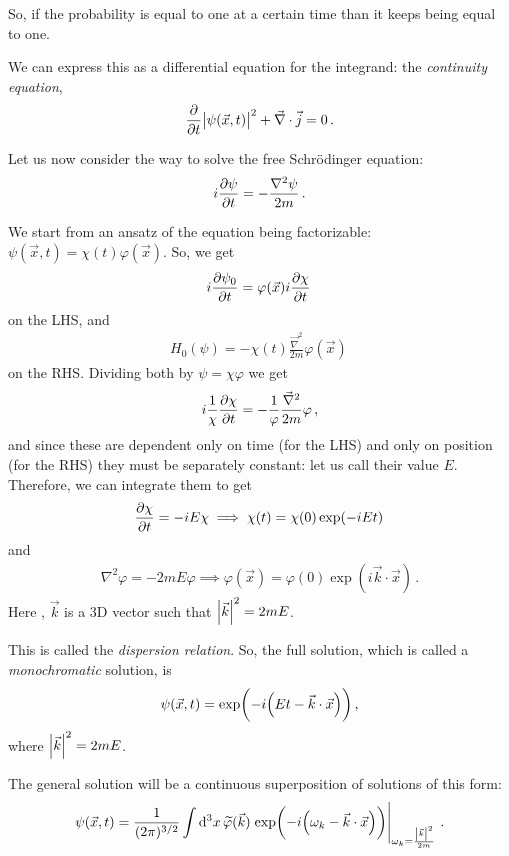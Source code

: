 \documentclass[main.tex]{subfiles}
\begin{document}
So, if the probability is equal to one at a certain time than it keeps being equal to one. 

We can express this as a differential equation for the integrand: the \emph{continuity equation}, 
%
\begin{align}
\pdv{}{t} \abs{\psi  (\vec{x}, t)}^2 + \vec{\nabla} \cdot \vec{j} = 0
\,.
\end{align}

Let us now consider the way to solve the free Schrödinger equation: 
%
\begin{align}
i \pdv{\psi }{t} = - \frac{\nabla^2 \psi }{2m } 
\,.
\end{align}

We start from an ansatz of the equation being factorizable: \(\psi (\vec{x}, t) = \chi (t) \varphi (\vec{x})\). So, we get 
%
\begin{align}
i \pdv{\psi_{0}}{t} = \varphi (\vec{x}) i \pdv{\chi }{t}
\,
\end{align}
%
on the LHS, and 
%
\begin{align}
H_0 (\psi ) = - \chi (t) \frac{\vec{\nabla}^2}{2m} \varphi (\vec{x})
\,
\end{align}
%
on the RHS. Dividing both by \(\psi = \chi \varphi \) we get 
%
\begin{align}
i \frac{1}{\chi } \pdv{\chi }{t} = - \frac{1}{\varphi } \frac{\vec{\nabla}^2}{2m} \varphi 
\,,
\end{align}
%
and since these are dependent only on time (for the LHS) and only on position (for the RHS) they must be separately constant: let us call their value \(E\). Therefore, we can integrate them to get 
%
\begin{align}
\pdv{\chi }{t} = - i E \chi  \implies \chi (t) = \chi (0) \exp(-iEt)
\,
\end{align}
%
and 
%
\begin{align}
\nabla^2 \varphi = -2 m E \varphi  \implies \varphi (\vec{x}) = \varphi (0) \exp(i \vec{k} \cdot \vec{x})
\,.
\end{align}
%
Here , \(\vec{k}\) is a 3D vector such that \(\abs{\vec{k}}^2 = 2 m E\). 

This is called the \emph{dispersion relation}. So, the full solution, which is called a \emph{monochromatic} solution, is 
%
\begin{align}
\psi (\vec{x}, t) = \exp(-i \qty(Et - \vec{k} \cdot \vec{x}))
\,,
\end{align}
%
where \(\abs{\vec{k}}^2 = 2mE\).

The general solution will be a continuous superposition of solutions of this form: 
%
\begin{align}
\psi (\vec{x}, t) = \frac{1}{(2\pi )^{3/2}} \int \dd[3]{x} \widetilde{\varphi} (\vec{k}) \eval{\exp(-i \qty(\omega_{k} - \vec{k} \cdot \vec{x}))}_{\omega_{k} = \frac{\abs{\vec{k}}^2}{2m}}
\,.
\end{align}
\end{document}
